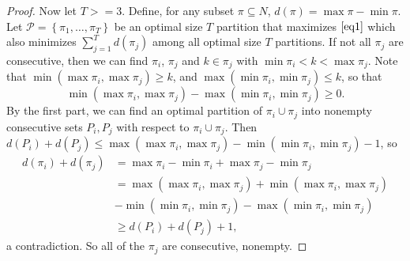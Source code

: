 \documentclass{article}
\theoremstyle{case}
\begin{document}
\begin{proof}
Now let $T >= 3$. Define, for any subset $\pi \subseteq N$, $d\left(\pi\right) = \max \pi - \min \pi$. Let $\mathcal{P} = \left\lbrace \pi_1, \dots, \pi_T\right\rbrace$ be an optimal size $T$ partition that maximizes $\ref{eq1}$ which also minimizes $\sum_{j=1}^T d\left(\pi_j\right)$ among all optimal size $T$ partitions. If not all $\pi_j$ are consecutive, then we can find $\pi_i$, $\pi_j$ and $k \in \pi_j$ with $\min \pi_i < k < \max \pi_j$. Note that $\min\left( \max \pi_i, \max \pi_j\right) \geq k$,  and $\max\left( \min \pi_i, \min \pi_j \right) \leq k$, so that 
\[
\min\left( \max \pi_i, \max \pi_j\right) - \max\left( \min \pi_i, \min \pi_j \right) \geq 0.
\] 
By the first part, we can find an optimal partition of $\pi_i \cup \pi_j$ into nonempty consecutive sets $P_i, P_j$ with respect to $\pi_i \cup \pi_j$. Then $d\left( P_i\right) + d\left( P_j\right) \leq \max\left( \max \pi_i, \max \pi_j\right) - \min\left( \min \pi_i, \min \pi_j\right) - 1$, so
\begin{align*}
d\left(\pi_i\right) + d\left( \pi_j\right) &= \max \pi_i - \min \pi_i + \max \pi_j - \min \pi_j \\
&= \max\left(\max \pi_i, \max \pi_j\right) + \min\left( \max \pi_i, \max \pi_j\right) \\
&- \min\left( \min \pi_i, \min \pi_j \right) - \max\left( \min \pi_i, \min \pi_j\right) \\
&\geq d\left(P_i\right) + d\left(P_j\right) + 1,
\end{align*}
a contradiction. So all of the $\pi_j$ are consecutive, nonempty.


\end{proof}
\end{document}

